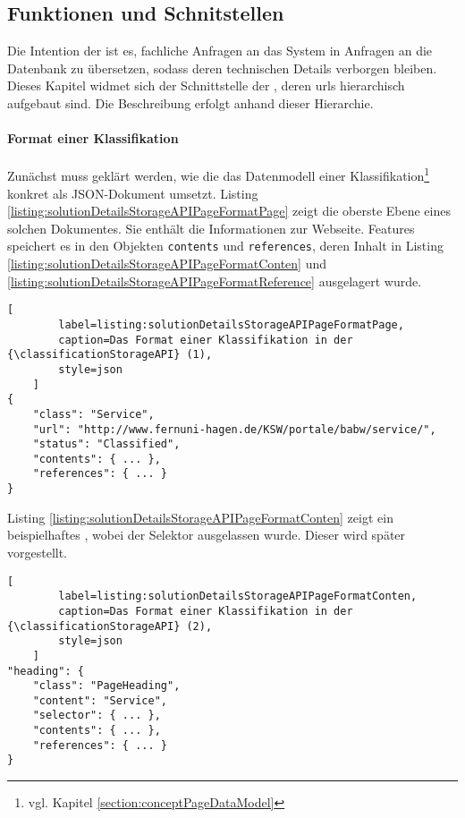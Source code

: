 \subsection{Funktionen und Schnitstellen}
    Die Intention der {\classificationStorageAPI} ist es,
    fachliche Anfragen an das System in Anfragen an die Datenbank zu übersetzen,
    sodass deren technischen Details verborgen bleiben.
    Dieses Kapitel widmet sich der Schnittstelle der {\classificationStorageAPI},
    deren \glspl{url} hierarchisch aufgebaut sind.
    Die Beschreibung erfolgt anhand dieser Hierarchie.

    \paragraph{Format einer Klassifikation}
    Zunächst muss geklärt werden, wie die {\classificationStorageAPI} das Datenmodell einer
    Klassifikation\footnote{vgl. Kapitel \ref{section:conceptPageDataModel}} konkret als JSON-Dokument umsetzt.
    Listing \ref{listing:solutionDetailsStorageAPIPageFormatPage} zeigt die oberste Ebene eines solchen Dokumentes.
    Sie enthält die Informationen zur Webseite.
    Features speichert es in den Objekten \texttt{contents} und \texttt{references},
    deren Inhalt in Listing \ref{listing:solutionDetailsStorageAPIPageFormatConten}
    und \ref{listing:solutionDetailsStorageAPIPageFormatReference} ausgelagert wurde.

    \begin{lstlisting}[
        label=listing:solutionDetailsStorageAPIPageFormatPage,
        caption=Das Format einer Klassifikation in der {\classificationStorageAPI} (1),
        style=json
    ]
{
    "class": "Service",
    "url": "http://www.fernuni-hagen.de/KSW/portale/babw/service/",
    "status": "Classified",
    "contents": { ... },
    "references": { ... }
}
    \end{lstlisting}

    Listing \ref{listing:solutionDetailsStorageAPIPageFormatConten}
    zeigt ein beispielhaftes {\contentFeature},
    wobei der Selektor ausgelassen wurde.
    Dieser wird später vorgestellt.

    \begin{lstlisting}[
        label=listing:solutionDetailsStorageAPIPageFormatConten,
        caption=Das Format einer Klassifikation in der {\classificationStorageAPI} (2),
        style=json
    ]
"heading": {
    "class": "PageHeading",
    "content": "Service",
    "selector": { ... },
    "contents": { ... },
    "references": { ... }
}
    \end{lstlisting}

